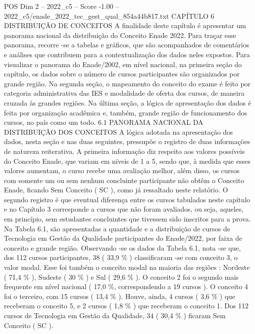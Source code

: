 \begin{textsample}{POS Dim 2 – 2022\_c5 – Score -1.00 – 2022\_c5/enade\_2022\_tec\_gest\_qual\_854a44b817.txt}  \label{ex:f2_pos_222}
CAPÍTULO 6 DISTRIBUIÇÃO DE CONCEITOS A finalidade deste capítulo é apresentar um panorama nacional da distribuição do Conceito Enade 2022.
Para traçar esse panorama, recorre -se a tabelas e gráficos, que são acompanhados de comentários e análises que contribuem para a contextualização dos dados neles expostos.
Para visualizar o panorama do Enade/2002, em nível nacional, na primeira seção do capítulo, os dados sobre o número de cursos participantes são organizados por grande região.
Na segunda seção, o mapeamento do conceito do exame é feito por categoria administrativa das IES e modalidade de oferta dos cursos, de maneira cruzada às grandes regiões.
Na última seção, a lógica de apresentação dos dados é feita por organização acadêmica e, também, grande região de funcionamento dos cursos, no país como um todo. 6.1 PANORAMA NACIONAL DA DISTRIBUIÇÃO DOS CONCEITOS A lógica adotada na apresentação dos dados, nesta seção e nas duas seguintes, pressupõe o registro de duas informações de natureza reiterativa.
A primeira informação diz respeito aos valores possíveis do Conceito Enade, que variam em níveis de 1 a 5, sendo que, à medida que esses valores aumentam, o curso recebe uma avaliação melhor, além disso, os cursos com somente um ou sem nenhum concluinte participante não obtêm o Conceito Enade, ficando Sem Conceito ( SC ), como já ressaltado neste relatório.
O segundo registro é que eventual diferença entre os cursos tabulados neste capítulo e no Capítulo 3 corresponde a cursos que não foram avaliados, ou seja, aqueles, em princípio, sem estudantes concluintes que tivessem sido inscritos para a prova.
Na Tabela 6.1, são apresentadas a quantidade e a distribuição de cursos de Tecnologia em Gestão da Qualidade participantes do Enade/2022, por faixa de conceito e grande região.
Observando -se os dados da Tabela 6.1, nota -se que, dos 112 cursos participantes, 38 ( 33,9 \% ) classificaram -se com conceito 3, o valor modal.
Esse foi também o conceito modal na maioria das regiões : Nordeste ( 71,4 \% ), Sudeste ( 30 \% ) e Sul ( 29,6 \% ).
O conceito 2 foi o segundo mais frequente em nível nacional ( 17,0 \%, correspondendo a 19 cursos ).
O conceito 4 foi o terceiro, com 15 cursos ( 13,4 \% ).
Houve, ainda, 4 cursos ( 3,6 \% ) que receberam o conceito 5, e 2 cursos ( 1,8 \% ) que receberam o conceito 1.
Dos 112 cursos de Tecnologia em Gestão da Qualidade, 34 ( 30,4 \% ) ficaram Sem Conceito ( SC ).

\end{textsample}

